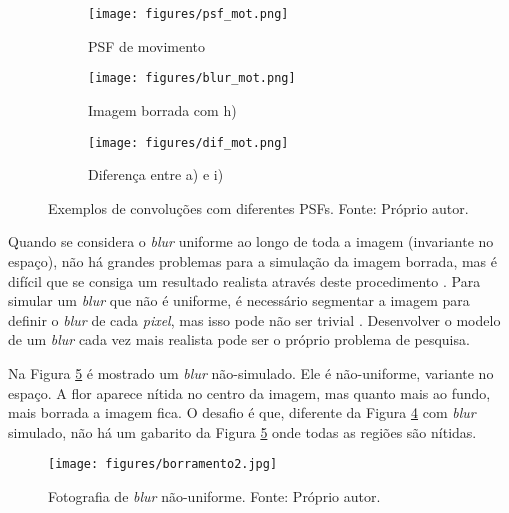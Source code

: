 \begin{figure}[H]
     \begin{subfigure}[b]{0.32\textwidth}
         \centering
         \texttt{[image: figures/psf\_mot.png]}
         \caption{PSF de movimento}
                  \label{fig:01_002h}
     \end{subfigure}
     \hfill
     \begin{subfigure}[b]{0.32\textwidth}
         \centering
                  \texttt{[image: figures/blur\_mot.png]}
         \caption{Imagem borrada com h)}
                  \label{fig:01_002i}
     \end{subfigure}
     \hfill
          \begin{subfigure}[b]{0.32\textwidth}
         \centering
                  \texttt{[image: figures/dif\_mot.png]}
         \caption{Diferença entre a) e i)}
                  \label{fig:01_002j}
      \end{subfigure}

\caption[Exemplos de convoluções com diferentes PSFs.]{Exemplos de convoluções com diferentes PSFs. Fonte: Próprio autor.}
\label{fig:01_002}
\end{figure}




Quando se considera o \textit{blur} uniforme ao longo de toda a imagem (invariante no espaço), não há grandes problemas para a simulação da imagem borrada, mas é difícil que se consiga um resultado realista através deste procedimento \cite{Koh2021}. Para simular um \textit{blur} que não é uniforme, é necessário segmentar a imagem para definir o \textit{blur} de cada \textit{pixel}, mas isso pode não ser trivial \cite{Koh2021}. Desenvolver o modelo de um \textit{blur} cada vez mais realista pode ser o próprio problema de pesquisa. 

Na Figura \ref{fig:01_0002} é mostrado um \textit{blur} não-simulado. Ele é não-uniforme, variante no espaço. A flor aparece nítida no centro da imagem, mas quanto mais ao fundo, mais borrada a imagem fica. O desafio é que, diferente da Figura \ref{fig:01_002} com \textit{blur} simulado, não há um gabarito da Figura \ref{fig:01_0002} onde todas as regiões são nítidas. 
\begin{figure}[!ht]
\centering
\texttt{[image: figures/borramento2.jpg]} \caption[Fotografia de \textit{blur} não-uniforme.]{Fotografia de \textit{blur} não-uniforme. Fonte: Próprio autor.} 
\label{fig:01_0002}
\end{figure}

